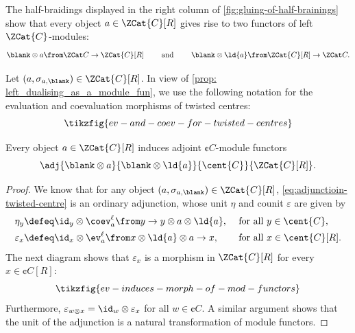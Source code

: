 The half-braidings displayed in the right column of \cref{fig:gluing-of-half-brainings}
show that every object \(a \in \ZCat{C}[R]\) gives rise to two functors of left \(\ZCat{C}\)\hyp{}modules:
\begin{equation}\label{eq: objs_as_mod_funs}
  \blank \otimes a \from \ZCat C \to \ZCat{C}[R]
  \qquad \text{ and } \qquad
  \blank \otimes \ld{a} \from \ZCat{C}[R] \to \ZCat C.
\end{equation}

Let \((a, \sigma_{a, \blank}) \in \ZCat{C}[R]\).
In view of \cref{prop: left_dualising_as_a_module_fun},
we use the following notation
for the evaluation and coevaluation morphisms of twisted centres:
\begin{equation}\label{eq: ev_and_coev_for_twisted_centres}
  \tikzfig{ev-and-coev-for-twisted-centres}
\end{equation}

\begin{proposition}\label{prop: adjunction_twisted_centre}
  Every object \(a \in \ZCat{C}[R]\) induces adjoint \(\cent{C}\)\hyp{}module functors
  \begin{equation}\label{eq:adjunctioin-twisted-centre}
    \adj{\blank \otimes a}{\blank \otimes \ld{a}}{\cent{C}}{\ZCat{C}[R]}.
  \end{equation}
\end{proposition}
\begin{proof}
  We know that for any object \((a, \sigma_{a,\blank}) \in \ZCat{C}[R]\),
  \cref{eq:adjunctioin-twisted-centre}
  is an ordinary adjunction,
  whose unit \(\eta\) and counit \(\varepsilon\) are given by
  \begin{align*}
    \eta_y &\defeq \id_y \otimes \coev^{\ell}_a \from y \to y\otimes a \otimes \ld{a},&& \text{ for all } y \in \cent{C},\\
    \varepsilon_x &\defeq \id_x \otimes \ev^{\ell}_a \from x \otimes \ld{a} \otimes a \to x,&& \text{ for all } x \in \cent{C}[R].
  \end{align*}
  The next diagram shows that \(\varepsilon_x\) is a morphism in \(\ZCat{C}[R]\) for every \(x \in \cent{C}[R]\):
  \begin{equation}\label{eq:ev-induces-morph-of-mod-functors}
    \tikzfig{ev-induces-morph-of-mod-functors}
  \end{equation}
  Furthermore, \(\varepsilon_{w \otimes x} = \id_w \otimes \varepsilon_x\) for all \(w \in \cent{C}\).
  A similar argument shows that the unit of the adjunction is a natural transformation of module functors.
\end{proof}


